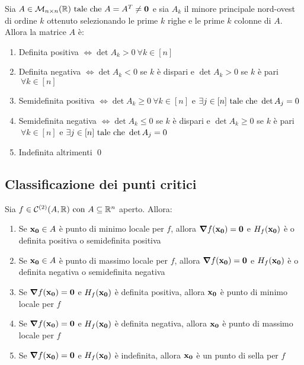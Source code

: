 \begin{theorem}
    Sia $A \in \mathcal{M}_{n\times n}(\mathbb{R}) \text{ tale che } A=A^T\neq \vb{0}$ e sia $A_k$ il minore principale nord-ovest di ordine $k$ ottenuto selezionando le prime $k$ righe e le prime $k$ colonne di $A$. Allora la matrice $A$ è:
    \begin{enumerate}
        \item Definita positiva $\iff \det A_k > 0 \ \forall k \in [n]$
        \item Definita negativa $\iff \det A_k < 0$ se $k$ è dispari e $\det A_k > 0$ se $k$ è pari $ \ \forall k \in [n]$
        \item Semidefinita positiva $\iff \det A_k \geq 0 \ \forall k \in [n]$ e $\exists j \in [n] \text{ tale che } \det A_j = 0$
        \item Semidefinita negativa $\iff \det A_k \leq 0$ se $k$ è dispari e $\det A_k \geq 0$ se $k$ è pari $ \ \forall k \in [n]$ e $\exists j \in [n] \text{ tale che } \det A_j=0$
        \item Indefinita altrimenti
        \qed
    \end{enumerate}
\end{theorem}

\subsection{Classificazione dei punti critici}

\begin{theorem}
    Sia $f \in \mathcal{C}^{(2)}(A, \mathbb{R}) \text{ con } A\subseteq \mathbb{R}^n$ aperto. Allora:
    \begin{enumerate}
        \item Se $\vb{x_0} \in A$ è punto di minimo locale per $f$, allora $\grad f(\vb{x_0})=\vb{0}$ e $H_f(\vb{x_0})$ è o definita positiva o semidefinita positiva
        \item Se $\vb{x_0} \in A$ è punto di massimo locale per $f$, allora $\grad f(\vb{x_0})=\vb{0}$ e $H_f(\vb{x_0})$ è o definita negativa o semidefinita negativa
        \item Se $\grad f(\vb{x_0})=\vb{0}$ e $H_f(\vb{x_0})$ è definita positiva, allora $\vb{x_0}$ è punto di minimo locale per $f$
        \item Se $\grad f(\vb{x_0})=\vb{0}$ e $H_f(\vb{x_0})$ è definita negativa, allora $\vb{x_0}$ è punto di massimo locale per $f$
        \item Se $\grad f(\vb{x_0})=\vb{0}$ e $H_f(\vb{x_0})$ è indefinita, allora $\vb{x_0}$ è un punto di sella per $f$
    \end{enumerate}
\end{theorem}

